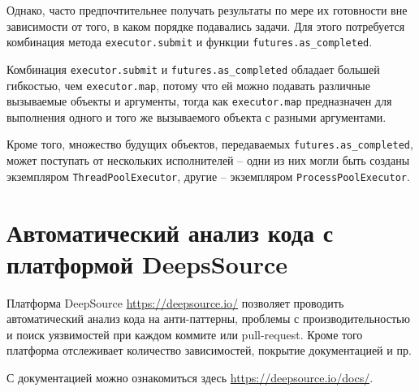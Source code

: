 \documentclass[%
	11pt,
	a4paper,
	utf8,
		]{article}
\begin{document}
Однако, часто предпочтительнее получать результаты по мере их готовности вне зависимости от того, в каком порядке подавались задачи. Для этого потребуется комбинация метода \texttt{executor.submit} и функции \texttt{futures.as\_completed}.

Комбинация \texttt{executor.submit} и \texttt{futures.as\_completed} обладает большей гибкостью, чем \texttt{executor.map}, потому что ей можно подавать различные вызываемые объекты и аргументы, тогда как \texttt{executor.map} предназначен для выполнения одного и того же вызываемого объекта с разными аргументами.

Кроме того, множество будущих объектов, передаваемых \texttt{futures.as\_completed}, может поступать от нескольких исполнителей -- одни из них могли быть созданы экземпляром \texttt{ThreadPoolExecutor}, другие -- экземпляром \texttt{ProcessPoolExecutor}.


\section{Автоматический анализ кода с платформой DeepsSource}

Платформа DeepSource \url{https://deepsource.io/} позволяет проводить автоматический анализ кода на анти-паттерны, проблемы с производительностью и поиск уязвимостей при каждом коммите или pull-request. Кроме того платформа отслеживает количество зависимостей, покрытие документацией и пр.

С документацией можно ознакомиться здесь \url{https://deepsource.io/docs/}.
\end{document}
